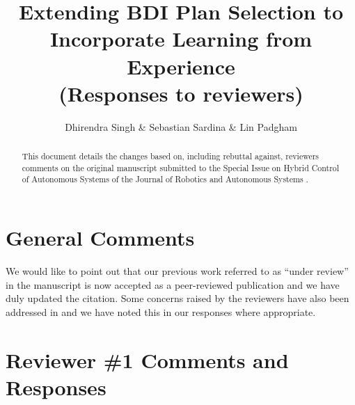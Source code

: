 \documentclass[preprint,12pt]{elsarticle}
\begin{document}
\begin{frontmatter}

\title{Extending BDI Plan Selection to Incorporate Learning from Experience\\
(Responses to reviewers)}

\author{Dhirendra Singh \& Sebastian Sardina \& Lin Padgham}
\address{RMIT University, Melbourne, Australia}

\begin{abstract}
This document details the changes based on, including rebuttal against, reviewers comments on the original manuscript submitted to the Special Issue on Hybrid Control of Autonomous Systems of the Journal of Robotics and Autonomous Systems \cite{Singh:HYCAS10}.    
\end{abstract}

\end{frontmatter}


\section*{General Comments}

We would like to point out that our previous work referred to as ``under review''
in the manuscript  is now accepted as a peer-reviewed publication
\cite{Singh:AAMAS10} and we have duly updated the citation. Some concerns raised
by the reviewers have also been addressed in \cite{Singh:AAMAS10} and we have
noted this in our responses where appropriate.

\section{Reviewer \#1 Comments and Responses}

\end{document}
